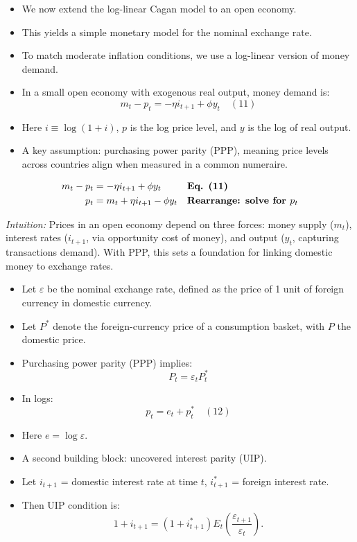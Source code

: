 \documentclass[12pt]{article}
\begin{document}
\begin{itemize}
    \item We now extend the log-linear Cagan model to an open economy.  
    \item This yields a simple monetary model for the nominal exchange rate.  
    \item To match moderate inflation conditions, we use a log-linear version of money demand.  
    \item In a small open economy with exogenous real output, money demand is:  
    \[
        m_t - p_t = -\eta i_{t+1} + \phi y_t \quad (11)
    \]  
    \item Here $i \equiv \log(1+i)$, $p$ is the log price level, and $y$ is the log of real output.  
    \item A key assumption: purchasing power parity (PPP), meaning price levels across countries align when measured in a common numeraire.  
\end{itemize}


\singlespacing
\begin{align}
m_t - p_t &= -\eta i_{t+1} + \phi y_t && \text{\textbf{Eq. (11)}} \\
p_t &= m_t + \eta i_{t+1} - \phi y_t && \text{\textbf{Rearrange: solve for $p_t$}}
\end{align}


\textit{Intuition:}  
Prices in an open economy depend on three forces: money supply ($m_t$), interest rates ($i_{t+1}$, via opportunity cost of money), and output ($y_t$, capturing transactions demand). With PPP, this sets a foundation for linking domestic money to exchange rates.

\begin{itemize}
    \item Let $\varepsilon$ be the nominal exchange rate, defined as the price of 1 unit of foreign currency in domestic currency.  
    \item Let $P^*$ denote the foreign-currency price of a consumption basket, with $P$ the domestic price.  
    \item Purchasing power parity (PPP) implies:  
    \[
        P_t = \varepsilon_t P_t^* 
    \]  
    \item In logs:  
    \[
        p_t = e_t + p_t^* \quad (12)
    \]  
    \item Here $e = \log \varepsilon$.  
    \item A second building block: uncovered interest parity (UIP).  
    \item Let $i_{t+1}$ = domestic interest rate at time $t$, $i_{t+1}^*$ = foreign interest rate.  
    \item Then UIP condition is:  
    \[
        1 + i_{t+1} = (1 + i_{t+1}^*) E_t\!\left(\frac{\varepsilon_{t+1}}{\varepsilon_t}\right).
    \]  
\end{itemize}
\end{document}
